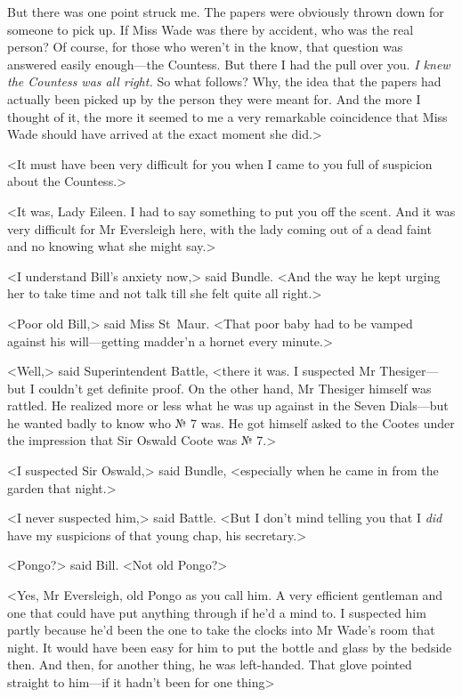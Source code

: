 But there was one point struck me. The papers were obviously thrown down for someone to pick up. If Miss Wade was there by accident, who was the real person? Of course, for those who weren't in the know, that question was answered easily enough—the Countess. But there I had the pull over you. \emph{I knew the Countess was all right.} So what follows? Why, the idea that the papers had actually been picked up by the person they were meant for. And the more I thought of it, the more it seemed to me a very remarkable coincidence that Miss Wade should have arrived at the exact moment she did.>

<It must have been very difficult for you when I came to you full of suspicion about the Countess.>

<It was, Lady Eileen. I had to say something to put you off the scent. And it was very difficult for Mr Eversleigh here, with the lady coming out of a dead faint and no knowing what she might say.>

<I understand Bill's anxiety now,> said Bundle. <And the way he kept urging her to take time and not talk till she felt quite all right.>

<Poor old Bill,> said Miss St~Maur. <That poor baby had to be vamped against his will—getting madder'n a hornet every minute.>

<Well,> said Superintendent Battle, <there it was. I suspected Mr Thesiger—but I couldn't get definite proof. On the other hand, Mr Thesiger himself was rattled. He realized more or less what he was up against in the Seven Dials—but he wanted badly to know who № 7 was. He got himself asked to the Cootes under the impression that Sir Oswald Coote was № 7.>

<I suspected Sir Oswald,> said Bundle, <especially when he came in from the garden that night.>

<I never suspected him,> said Battle. <But I don't mind telling you that I \emph{did} have my suspicions of that young chap, his secretary.>

<Pongo?> said Bill. <Not old Pongo?>

<Yes, Mr Eversleigh, old Pongo as you call him. A very efficient gentleman and one that could have put anything through if he'd a mind to. I suspected him partly because he'd been the one to take the clocks into Mr Wade's room that night. It would have been easy for him to put the bottle and glass by the bedside then. And then, for another thing, he was left-handed. That glove pointed straight to him—if it hadn't been for one thing\longdash>


